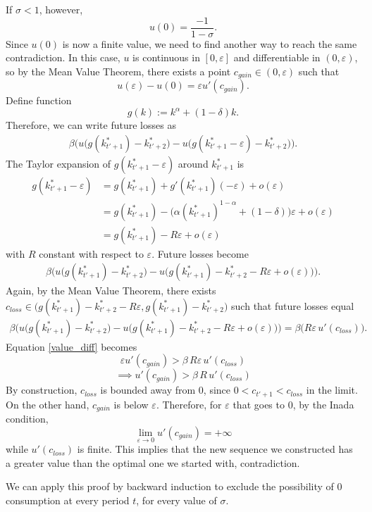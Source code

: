 If $\sigma < 1$, however, $$u (0)  = \frac{-1}{1 - \sigma}.$$
Since $u(0)$ is now a finite value, we need to find another way to reach the same contradiction. In this case, $u$ is continuous in $[0, \varepsilon]$ and differentiable in $(0, \varepsilon)$, so by the Mean Value Theorem, there exists a point $c_{gain} \in (0, \varepsilon)$ such that $$u(\varepsilon) - u(0) = \varepsilon u'(c_{gain}).$$
Define function \[
g (k) := k^\alpha + (1 - \delta)k.
\]
Therefore, we can write future losses as 
\begin{align*}
    \beta \Big( u \big(g(k_{t'+1}^*) - k_{t' + 2}^*\big) - u \big(g(k^*_{t'+1}- \varepsilon)- k_{t' + 2}^*\big)  \Big).
\end{align*}
The Taylor expansion of $g(k^*_{t'+1} - \varepsilon)$ around $k^*_{t'+1}$ is 
\begin{align*}
g(k^*_{t'+1}- \varepsilon) &= g(k^*_{t'+1}) + g'(k^*_{t'+1})(-\varepsilon) + o(\varepsilon) \\
& = g(k^*_{t'+1}) - \big(\alpha(k^*_{t'+ 1})^{1 - \alpha} + (1 - \delta)\big)  \varepsilon  + o (\varepsilon)\\
& = g(k^*_{t'+1}) - R \varepsilon  + o (\varepsilon)
\end{align*}
with $R$ constant with respect to $\varepsilon$.
Future losses become
\begin{align*}
    \beta \Big(u \big(g(k_{t'+1}^*) - k_{t' + 2}^*\big) - u \big(g(k^*_{t'+1})- k_{t' + 2}^* - R \varepsilon  + o (\varepsilon)\big)  \Big).
\end{align*}
Again, by the Mean Value Theorem, there exists $c_{loss} \in \big(g(k^*_{t'+1})- k_{t' + 2}^* - R \varepsilon, g(k^*_{t'+1})- k_{t' + 2}^*\big)$ such that future losses equal 
\begin{align*}
     \beta \Big( u \big(g(k_{t'+1}^*) - k_{t' + 2}^*\big) - u \big(g(k^*_{t'+1})- k_{t' + 2}^* - R \varepsilon  + o (\varepsilon)\big)\Big) = \beta\Big(R\varepsilon\, u'(c_{loss})\Big).
\end{align*}
Equation \eqref{value_diff} becomes 
\[\varepsilon u'(c_{gain}) > \beta\,R\varepsilon\, u'(c_{loss}) \]
\[\implies u'(c_{gain}) > \beta\,R\, u'(c_{loss})\]
By construction, $c_{loss}$ is bounded away from 0, since $0 < c_{t'+1} < c_{loss}$ in the limit. On the other hand,  $c_{gain}$ is below $\varepsilon$. Therefore, for $\varepsilon$ that goes to 0, by the Inada condition, 
\[\lim_{\varepsilon \to 0} u'(c_{gain}) = + \infty\]
while $u'(c_{loss})$ is finite. This implies that the new sequence we constructed has a greater value than the optimal one we started with, contradiction.

We can apply this proof by backward induction to exclude the possibility of 0 consumption at every period $t$, for every value of $\sigma$.
